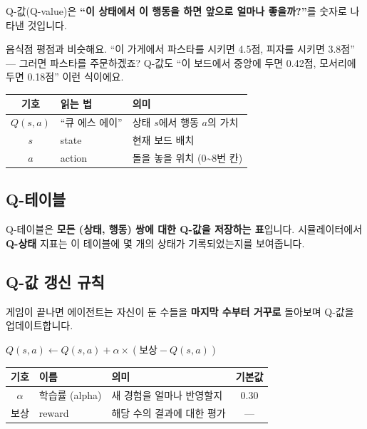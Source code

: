 \documentclass[11pt,a4paper]{article}
\begin{document}
Q-값(Q-value)은 \textbf{``이 상태에서 이 행동을 하면 앞으로 얼마나 좋을까?''}를 숫자로 나타낸 것입니다.

\begin{tipbox}
음식점 평점과 비슷해요. ``이 가게에서 파스타를 시키면 4.5점, 피자를 시키면 3.8점'' — 그러면 파스타를 주문하겠죠? Q-값도 ``이 보드에서 중앙에 두면 0.42점, 모서리에 두면 0.18점'' 이런 식이에요.
\end{tipbox}

\begin{center}
\renewcommand{\arraystretch}{1.4}
\begin{tabular}{|c|l|l|}
\hline
\rowcolor{tableheader}
\textbf{기호} & \textbf{읽는 법} & \textbf{의미} \\
\hline
$Q(s, a)$ & ``큐 에스 에이'' & 상태 $s$에서 행동 $a$의 가치 \\
\hline
$s$ & state & 현재 보드 배치 \\
\hline
$a$ & action & 돌을 놓을 위치 (0\textasciitilde8번 칸) \\
\hline
\end{tabular}
\end{center}

\subsection{Q-테이블}

Q-테이블은 \textbf{모든 (상태, 행동) 쌍에 대한 Q-값을 저장하는 표}입니다. 시뮬레이터에서 \textbf{ Q-상태} 지표는 이 테이블에 몇 개의 상태가 기록되었는지를 보여줍니다.

\subsection{Q-값 갱신 규칙}

게임이 끝나면 에이전트는 자신이 둔 수들을 \textbf{마지막 수부터 거꾸로} 돌아보며 Q-값을 업데이트합니다.

\begin{infobox}[갱신 공식]
\centering\Large
$Q(s, a) \leftarrow Q(s, a) + \alpha \times (\text{보상} - Q(s, a))$
\end{infobox}

\begin{center}
\renewcommand{\arraystretch}{1.4}
\begin{tabular}{|c|l|l|c|}
\hline
\rowcolor{tableheader}
\textbf{기호} & \textbf{이름} & \textbf{의미} & \textbf{기본값} \\
\hline
$\alpha$ & 학습률 (alpha) & 새 경험을 얼마나 반영할지 & 0.30 \\
\hline
보상 & reward & 해당 수의 결과에 대한 평가 & — \\
\hline
\end{tabular}
\end{center}
\end{document}
